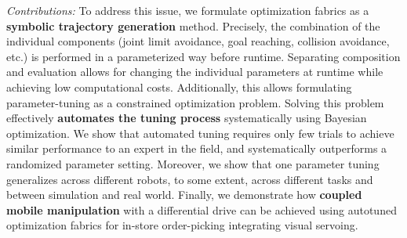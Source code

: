 \textit{Contributions:}
To address this issue, we formulate optimization fabrics as a \textbf{symbolic
trajectory generation} method. Precisely, the combination of the individual
components (joint limit avoidance, goal reaching, collision avoidance, etc.) is
performed in a parameterized way before runtime. Separating composition and
evaluation allows for changing the individual parameters at runtime while
achieving low computational costs. Additionally, this allows formulating
parameter-tuning as a constrained optimization problem. Solving this problem
effectively \textbf{automates the tuning process} systematically using
Bayesian optimization. We show that automated tuning requires only few trials
to achieve similar performance to an expert in the field, and systematically
outperforms a randomized parameter setting. Moreover, we show that one
parameter tuning generalizes across different robots, to some extent, across
different tasks and between simulation and real world.
Finally, we demonstrate how \textbf{coupled mobile manipulation} with
a differential drive can be achieved using autotuned optimization fabrics
for in-store order-picking integrating visual servoing.
